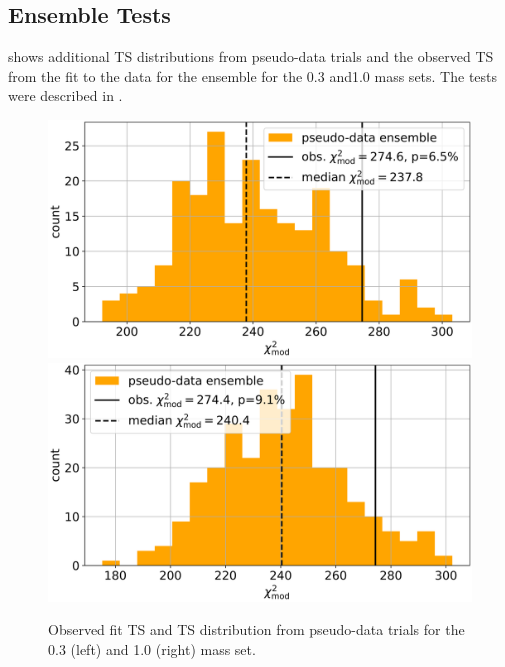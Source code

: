

\subsection{Ensemble Tests} 


 shows additional TS distributions from pseudo-data trials and the observed TS from the fit to the data for the ensemble for the \SI{0.3}{\gev} and\SI{1.0}{\gev} mass sets. The tests were described in .


\begin{figure}[h]
    \includegraphics[width=0.49\linewidth]{figures/results/checks/full_blind_fit_0.3_GeV_step_3_4-1.png}
    \includegraphics[width=0.49\linewidth]{figures/results/checks/full_blind_fit_1.0_GeV_step_3_4-1.png}
	\caption[Pseudo-data trials TS distribution (\SI{0.3}{\gev}, \SI{1.0}{\gev})]{Observed fit TS and TS distribution from pseudo-data trials for the \SI{0.3}{\gev} (left) and \SI{1.0}{\gev} (right) mass set.}
\end{figure}
